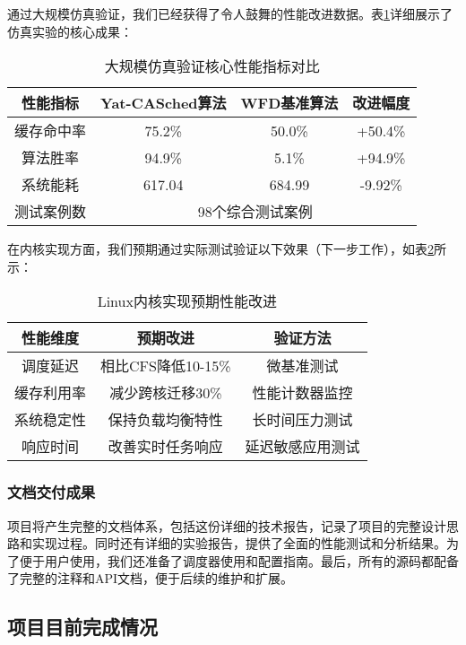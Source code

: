 通过大规模仿真验证，我们已经获得了令人鼓舞的性能改进数据。表\ref{tab:simulation-results}详细展示了仿真实验的核心成果：

\begin{table}[h]
\centering
\begin{tabular}{cccc}
\toprule
性能指标 & Yat-CASched算法 & WFD基准算法 & 改进幅度 \\
\midrule
缓存命中率 & 75.2\% & 50.0\% & +50.4\% \\
\midrule
算法胜率 & 94.9\% & 5.1\% & +94.9\% \\
\midrule
系统能耗 & 617.04 & 684.99 & -9.92\% \\
\midrule
测试案例数 & \multicolumn{3}{c}{98个综合测试案例} \\
\bottomrule
\end{tabular}
\caption{大规模仿真验证核心性能指标对比}
\label{tab:simulation-results}
\end{table}

在内核实现方面，我们预期通过实际测试验证以下效果（下一步工作），如表\ref{tab:kernel-expectations}所示：

\begin{table}[h]
\centering
\begin{tabular}{ccc}
\toprule
性能维度 & 预期改进 & 验证方法 \\
\midrule
调度延迟 & 相比CFS降低10-15\% & 微基准测试 \\
\midrule
缓存利用率 & 减少跨核迁移30\% & 性能计数器监控 \\
\midrule
系统稳定性 & 保持负载均衡特性 & 长时间压力测试 \\
\midrule
响应时间 & 改善实时任务响应 & 延迟敏感应用测试 \\
\bottomrule
\end{tabular}
\caption{Linux内核实现预期性能改进}
\label{tab:kernel-expectations}
\end{table}

\subsubsection{文档交付成果}

项目将产生完整的文档体系，包括这份详细的技术报告，记录了项目的完整设计思路和实现过程。同时还有详细的实验报告，提供了全面的性能测试和分析结果。为了便于用户使用，我们还准备了调度器使用和配置指南。最后，所有的源码都配备了完整的注释和API文档，便于后续的维护和扩展。

\subsection{项目目前完成情况}

